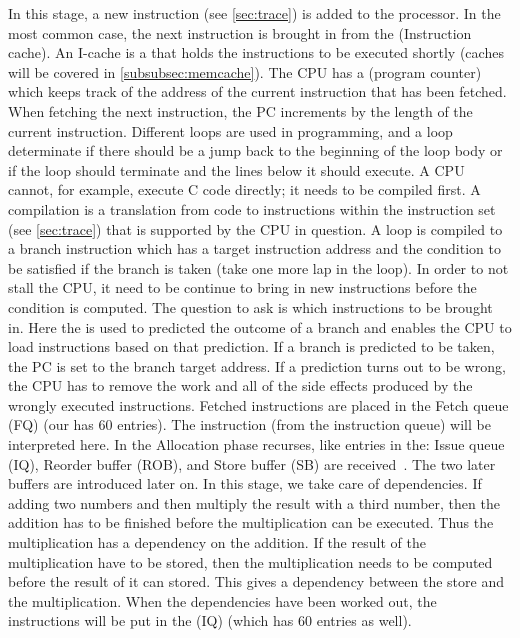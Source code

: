  In this stage, a new instruction (see \ref{sec:trace}) is added to the processor. In the most common case, the next instruction is brought in from the  (Instruction cache). An I-cache is a  that holds the instructions to be executed shortly (caches will be covered in \ref{subsubsec:memcache}). The CPU has a  (program counter) which keeps track of the address of the current instruction that has been fetched. When fetching the next instruction, the PC increments by the length of the current instruction. Different loops are used in programming, and a loop determinate if there should be a jump back to the beginning of the loop body or if the loop should terminate and the lines below it should execute. A CPU cannot, for example, execute C code directly; it needs to be compiled first. A compilation is a translation from code to instructions within the instruction set (see \ref{sec:trace}) that is supported by the CPU in question. A loop is compiled to a branch instruction which has a target instruction
address
and the condition to be satisfied if the branch is taken (take one more lap in the
loop). In order to not stall the CPU, it need to be continue to bring in new instructions before
the condition is computed. The question to ask is which instructions to be brought in. Here
the  is used to predicted the outcome of a branch and enables the CPU to load instructions based on that prediction. If a branch is predicted to be taken, the PC is set to the branch target address. If a prediction turns out to be wrong, the CPU has to remove the work and all of the side effects produced by the wrongly executed instructions. Fetched instructions are placed in the Fetch queue (FQ) (our has 60 entries).
 The instruction (from the instruction queue) will be interpreted here. In the Allocation phase recurses, like entries in the: Issue queue (IQ), Reorder buffer (ROB), and Store buffer (SB) are received~\cite{CPUbook}. The two later buffers are introduced later on.
 In this stage, we take care of dependencies. If adding two numbers and then multiply the result with a third number, then the addition has to be finished before the multiplication can be executed. Thus the multiplication has a dependency on the addition. If the result of the multiplication have to be stored, then the multiplication needs to be computed before the result of it can stored. This gives a dependency between the store and the multiplication. When the dependencies have been worked out, the instructions will be put in the  (IQ) (which has 60 entries as well).

